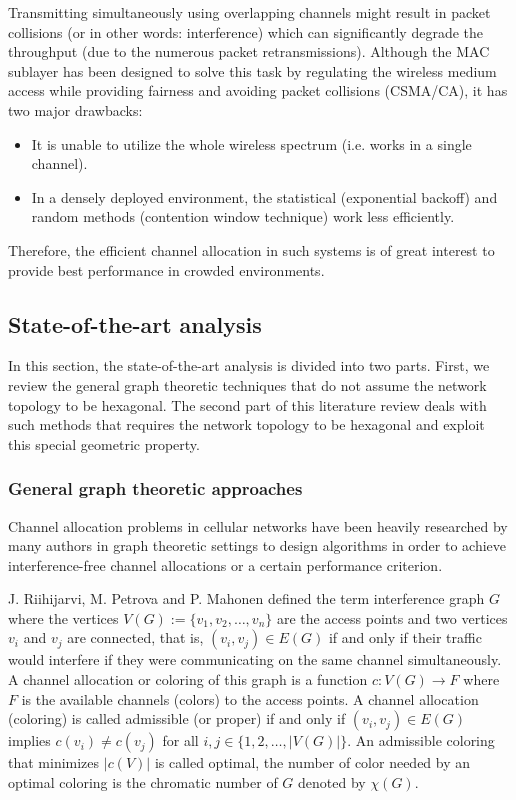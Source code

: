 \documentclass[a4paper, 12pt]{article}
\begin{document}
Transmitting simultaneously using overlapping channels might result in packet collisions (or in other words: interference) which can significantly degrade the throughput (due to the numerous packet retransmissions). Although the MAC sublayer has been designed to solve this task by regulating the wireless medium access while providing fairness and avoiding packet collisions (CSMA/CA), it has two major drawbacks: 
\begin{itemize}
\item It is unable to utilize the whole wireless spectrum (i.e. works in a single channel).
\item In a densely deployed environment, the statistical (exponential backoff) and random methods (contention window technique) work less efficiently.
\end{itemize} 
Therefore, the efficient channel allocation in such systems is of great interest to provide best performance in crowded environments. 


\subsection{State-of-the-art analysis}

In this section, the state-of-the-art analysis is divided into two parts. First, we review the general graph theoretic techniques that do not assume the network topology to be hexagonal. The second part of this literature review deals with such methods that requires the network topology to be hexagonal and exploit this special geometric property.

\subsubsection{General graph theoretic approaches}
Channel allocation problems in cellular networks have been heavily researched by many authors in graph theoretic settings \cite{marina, 1456167, mishra, wang-liu, orden} to design algorithms in order to achieve interference-free channel allocations or a certain performance criterion. 

J. Riihijarvi, M. Petrova and P. Mahonen \cite{marina} defined the term interference graph $G$ where the vertices $V(G):=\lbrace v_1,v_2, \ldots, v_n \rbrace$ are the access points and two vertices $v_i$ and $v_j$ are connected, that is, $(v_i,v_j) \in E(G)$ if and only if their traffic would interfere if they were communicating on the same channel simultaneously. A channel allocation or coloring of this graph is a function $c\colon V(G) \to F$ where $F$ is the available channels (colors) to the access points. A channel allocation (coloring) is called admissible (or proper) if and only if $(v_i,v_j) \in E(G)$ implies $c(v_i) \neq c(v_j)$ for all $i,j \in \lbrace 1, 2, \ldots, |V(G)| \rbrace$. An admissible coloring that minimizes $|c(V)|$ is called optimal, the number of color needed by an optimal coloring is the chromatic number of $G$ denoted by $\chi(G)$. 
\end{document}
